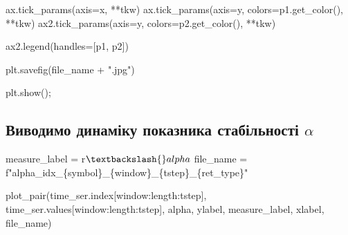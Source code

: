 \documentclass[
  letterpaper,
]{report}
\newenvironment{Shaded}{\begin{snugshade}}{\end{snugshade}}
\newcommand{\NormalTok}[1]{\textcolor[rgb]{0.00,0.23,0.31}{#1}}
\newcommand{\OperatorTok}[1]{\textcolor[rgb]{0.37,0.37,0.37}{#1}}
\newcommand{\SpecialCharTok}[1]{\textcolor[rgb]{0.37,0.37,0.37}{#1}}
\newcommand{\SpecialStringTok}[1]{\textcolor[rgb]{0.13,0.47,0.30}{#1}}
\newcommand{\StringTok}[1]{\textcolor[rgb]{0.13,0.47,0.30}{#1}}
\newcommand{\VerbatimStringTok}[1]{\textcolor[rgb]{0.13,0.47,0.30}{#1}}
\begin{document}
\begin{Shaded}
\begin{Highlighting}[]
\NormalTok{    ax.tick\_params(axis}\OperatorTok{=}\StringTok{\textquotesingle{}x\textquotesingle{}}\NormalTok{, }\OperatorTok{**}\NormalTok{tkw)}
\NormalTok{    ax.tick\_params(axis}\OperatorTok{=}\StringTok{\textquotesingle{}y\textquotesingle{}}\NormalTok{, colors}\OperatorTok{=}\NormalTok{p1.get\_color(), }\OperatorTok{**}\NormalTok{tkw)}
\NormalTok{    ax2.tick\_params(axis}\OperatorTok{=}\StringTok{\textquotesingle{}y\textquotesingle{}}\NormalTok{, colors}\OperatorTok{=}\NormalTok{p2.get\_color(), }\OperatorTok{**}\NormalTok{tkw)}


\NormalTok{    ax2.legend(handles}\OperatorTok{=}\NormalTok{[p1, p2])}

\NormalTok{    plt.savefig(file\_name }\OperatorTok{+} \StringTok{".jpg"}\NormalTok{)}
        
\NormalTok{    plt.show()}\OperatorTok{;}
\end{Highlighting}
\end{Shaded}

\hypertarget{ux432ux438ux432ux43eux434ux438ux43cux43e-ux434ux438ux43dux430ux43cux456ux43aux443-ux43fux43eux43aux430ux437ux43dux438ux43aux430-ux441ux442ux430ux431ux456ux43bux44cux43dux43eux441ux442ux456-alpha}{%
\subsection{\texorpdfstring{Виводимо динаміку показника стабільності
\(\alpha\)}{Виводимо динаміку показника стабільності \textbackslash alpha}}\label{ux432ux438ux432ux43eux434ux438ux43cux43e-ux434ux438ux43dux430ux43cux456ux43aux443-ux43fux43eux43aux430ux437ux43dux438ux43aux430-ux441ux442ux430ux431ux456ux43bux44cux43dux43eux441ux442ux456-alpha}}

\begin{Shaded}
\begin{Highlighting}[]
\NormalTok{measure\_label }\OperatorTok{=} \VerbatimStringTok{r\textquotesingle{}$\textbackslash{}alpha$\textquotesingle{}}
\NormalTok{file\_name }\OperatorTok{=} \SpecialStringTok{f"alpha\_idx\_}\SpecialCharTok{\{}\NormalTok{symbol}\SpecialCharTok{\}}\SpecialStringTok{\_}\SpecialCharTok{\{}\NormalTok{window}\SpecialCharTok{\}}\SpecialStringTok{\_}\SpecialCharTok{\{}\NormalTok{tstep}\SpecialCharTok{\}}\SpecialStringTok{\_}\SpecialCharTok{\{}\NormalTok{ret\_type}\SpecialCharTok{\}}\SpecialStringTok{"}
\end{Highlighting}
\end{Shaded}

\begin{Shaded}
\begin{Highlighting}[]
\NormalTok{plot\_pair(time\_ser.index[window:length:tstep],}
\NormalTok{          time\_ser.values[window:length:tstep],}
\NormalTok{          alpha, }
\NormalTok{          ylabel, }
\NormalTok{          measure\_label,}
\NormalTok{          xlabel,}
\NormalTok{          file\_name)}
\end{Highlighting}
\end{Shaded}
\end{document}
